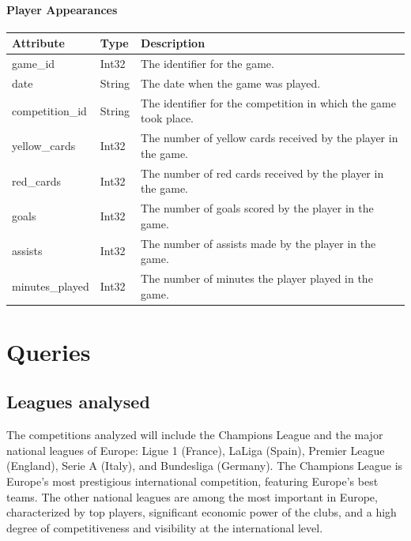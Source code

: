 \documentclass{Configuration_Files/PoliMi3i_thesis}
\begin{document}
\subsubsection{Player Appearances}
\begin{tabular}{|l|l|p{8cm}|}
    \hline
    \textbf{Attribute}      & \textbf{Type}    & \textbf{Description} \\ \hline
    game\_id                & Int32            & The identifier for the game. \\ \hline
    date                    & String           & The date when the game was played. \\ \hline
    competition\_id         & String           & The identifier for the competition in which the game took place. \\ \hline
    yellow\_cards           & Int32            & The number of yellow cards received by the player in the game. \\ \hline
    red\_cards              & Int32            & The number of red cards received by the player in the game. \\ \hline
    goals                   & Int32            & The number of goals scored by the player in the game. \\ \hline
    assists                 & Int32            & The number of assists made by the player in the game. \\ \hline
    minutes\_played         & Int32            & The number of minutes the player played in the game. \\ \hline
    \end{tabular}

\chapter{Queries}
\section{Leagues analysed}
The competitions analyzed will include the Champions League and the major national leagues of Europe: Ligue 1 (France), LaLiga (Spain), Premier League (England), Serie A (Italy), and Bundesliga (Germany). The Champions League is Europe's most prestigious international competition, featuring Europe's best teams. The other national leagues are among the most important in Europe, characterized by top players, significant economic power of the clubs, and a high degree of competitiveness and visibility at the international level.
\end{document}
